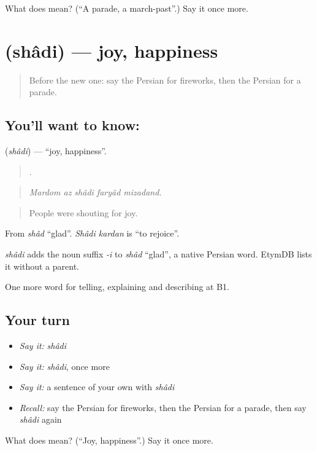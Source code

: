 \begin{tcolorbox}[breakable,colback=teal!4,colframe=teal!35!black,title={Before you move on}]
What does  mean? (\textquotedblleft{}A parade, a march-past\textquotedblright{}.) Say it once more.
\end{tcolorbox}
\section[\texorpdfstring{\fa{شادی} (shâdi)}{شادی (shâdi)}]{ (shâdi) — joy, happiness}

\label{lesson:FA-C342-shadi}



\begin{quote}
Before the new one: say the Persian for fireworks, then the Persian for a parade.
\end{quote}

\subsection*{You'll want to know: }
\textbf{} (\emph{shâdi}) — \textquotedblleft{}joy, happiness\textquotedblright{}.

\begin{quote}
    .
\end{quote}

\begin{quote}
\emph{Mardom az shâdi faryâd mizadand.}
\end{quote}

\begin{quote}
People were shouting for joy.
\end{quote}

From \emph{shâd} \textquotedblleft{}glad\textquotedblright{}. \emph{Shâdi kardan} is \textquotedblleft{}to rejoice\textquotedblright{}.

\begin{cousinweb}
\emph{shâdi} adds the noun suffix \emph{-i} to \emph{shâd} \textquotedblleft{}glad\textquotedblright{}, a native Persian word. EtymDB lists it without a parent.
\end{cousinweb}

\begin{grammarlens}[title={What you've built}]
One more word for telling, explaining and describing at B1.
\end{grammarlens}

\subsection*{Your turn}
\begin{itemize}
\raggedright
  \item \emph{Say it:} \emph{shâdi}
  \item \emph{Say it:} \emph{shâdi}, once more
  \item \emph{Say it:} a sentence of your own with \emph{shâdi}
  \item \emph{Recall:} say the Persian for fireworks, then the Persian for a parade, then say \emph{shâdi} again
\end{itemize}

\begin{tcolorbox}[breakable,colback=teal!4,colframe=teal!35!black,title={Before you move on}]
What does  mean? (\textquotedblleft{}Joy, happiness\textquotedblright{}.) Say it once more.
\end{tcolorbox}
